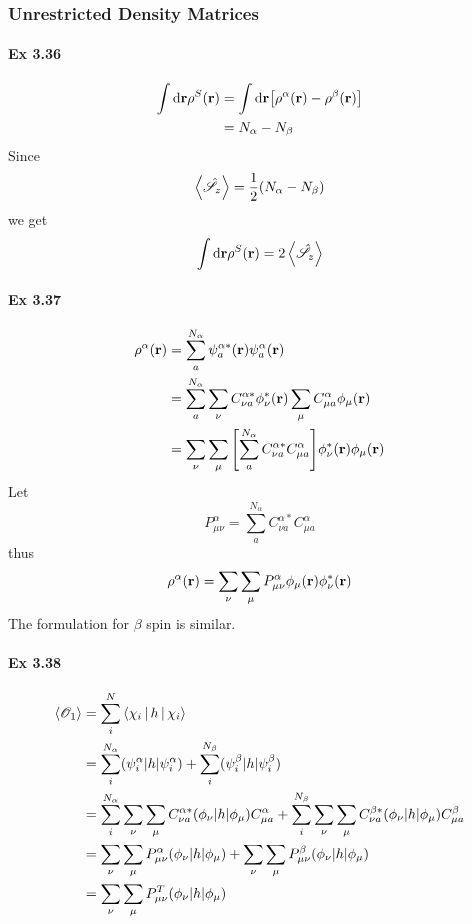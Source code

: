 \documentclass[a4paper]{article}
\newcommand{\hsS}{\hat{\mathscr{S}}}
\newcommand{\ex}[1]{\paragraph{Ex #1}}
\numberwithin{equation}{subsection}
\begin{document}
\subsubsection{Unrestricted Density Matrices}
\ex{3.36}
\begin{align}
\int\dd\vb{r} \rho^S(\vb{r}) &= \int\dd\vb{r} \qty[\rho^\alpha(\vb{r}) - \rho^\beta(\vb{r})] \\
&= N_\alpha - N_\beta
\end{align}
Since
\begin{equation}\label{key}
\ev{\hsS_z} = \dfrac{1}{2}(N_\alpha - N_\beta)
\end{equation}
we get
\begin{equation}\label{key}
\int\dd\vb{r} \rho^S(\vb{r}) = 2\ev{\hsS_z}
\end{equation}

\ex{3.37}
\begin{align}
\rho^\alpha(\vb{r}) &= \sum_a^{N_\alpha}  \psi_a^{\alpha*}(\vb{r})\psi_a^\alpha(\vb{r}) \notag\\
&=  \sum_a^{N_\alpha} \sum_\nu C^{\alpha*}_{\nu a}\phi_\nu^*(\vb{r}) 
\sum_\mu C_{\mu a}^\alpha\phi_\mu(\vb{r}) \notag\\
&= \sum_\nu\sum_\mu \qty[\sum_a^{N_\alpha} C^{\alpha*}_{\nu a}C_{\mu a}^\alpha ] \phi_\nu^*(\vb{r})\phi_\mu(\vb{r}) \notag\\
\end{align}
Let
\begin{equation}\label{key}
P^\alpha_{\mu\nu} = \sum_a^{N_\alpha} C^{\alpha*}_{\nu a}C_{\mu a}^\alpha 
\end{equation}
thus
\begin{equation}\label{key}
\rho^\alpha(\vb{r}) = \sum_\nu\sum_\mu P^\alpha_{\mu\nu} \phi_\mu(\vb{r}) \phi_\nu^*(\vb{r})
\end{equation}
The formulation for $ \beta $ spin is similar.

\ex{3.38}
\begin{align}
\ev{\mathscr{O}_1} &= \sum_i^N \Braket{\chi_i | h | \chi_i} \notag\\
&= \sum_i^{N_\alpha} (\psi_i^\alpha | h | \psi_i^\alpha) + \sum_i^{N_\beta} (\psi_i^\beta | h | \psi_i^\beta) \notag\\
&= \sum_i^{N_\alpha} \sum_\nu\sum_\mu C_{\nu a}^{\alpha*} (\phi_\nu | h | \phi_\mu) C_{\mu a}^\alpha 
+ \sum_i^{N_\beta} \sum_\nu\sum_\mu C_{\nu a}^{\beta*} (\phi_\nu | h | \phi_\mu) C_{\mu a}^\beta \notag\\
&= \sum_\nu\sum_\mu P_{\mu\nu}^\alpha (\phi_\nu | h | \phi_\mu) 
+ \sum_\nu\sum_\mu P_{\mu\nu}^\beta (\phi_\nu | h | \phi_\mu)  \notag\\
&= \sum_\nu\sum_\mu P_{\mu\nu}^T (\phi_\nu | h | \phi_\mu) 
\end{align}
\end{document}

